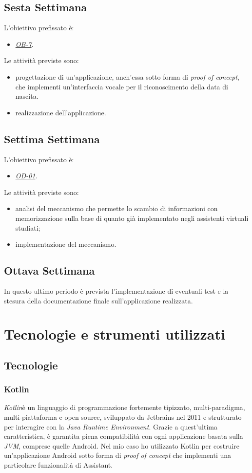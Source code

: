	\subsection*{Sesta Settimana}
	L'obiettivo prefissato è:
	\begin{itemize}
		\item \textit{\underline{OB-7}}.
	\end{itemize}
	Le attività previste sono:
	\begin{itemize}
		\item progettazione di un'applicazione, anch'essa sotto forma di \textit{proof of concept}, che implementi un'interfaccia vocale per il riconoscimento della data di nascita.
		\item realizzazione dell'applicazione.
	\end{itemize}
	\subsection*{Settima Settimana}
	L'obiettivo prefissato è:
	\begin{itemize}
		\item \textit{\underline{OD-01}}.
	\end{itemize}
	Le attività previste sono:
	\begin{itemize}
		\item analisi del meccanismo che permette lo scambio di informazioni con memorizzazione sulla base di quanto già implementato negli assistenti virtuali studiati;
		\item implementazione del meccanismo.
	\end{itemize}
	\subsection*{Ottava Settimana}
	In questo ultimo periodo è prevista l'implementazione di eventuali test e la stesura della documentazione finale sull'applicazione realizzata.

\section{Tecnologie e strumenti utilizzati}
	\subsection{Tecnologie}
		\subsubsection{Kotlin}
		\emph{Kotlin}\glsfirstoccur è un linguaggio di programmazione fortemente tipizzato, multi-paradigma, multi-piattaforma e open source, sviluppato da Jetbrains nel 2011 e strutturato per interagire con la \textit{Java Runtime Environment}. Grazie a quest'ultima caratteristica, è garantita piena compatibilità con ogni applicazione basata sulla \emph{JVM}\glsfirstoccur, comprese quelle Android. Nel mio caso ho utilizzato Kotlin per costruire un'applicazione Android sotto forma di \textit{proof of concept} che implementi una particolare funzionalità di Assistant.
